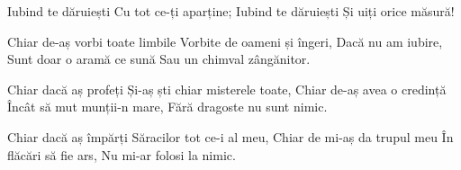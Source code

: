 \beginchorus
Iubind te dăruiești
Cu tot ce-ți aparține;
Iubind te dăruiești
Și uiți orice măsură!
\endchorus

\beginverse
Chiar de-aș vorbi toate limbile
Vorbite de oameni și îngeri,
Dacă nu am iubire,
Sunt doar o aramă ce sună
Sau un chimval zângănitor.
\endverse

\beginverse
Chiar dacă aș profeți
Și-aș ști chiar misterele toate,
Chiar de-aș avea o credință
Încât să mut munții-n mare,
Fără dragoste nu sunt nimic.
\endverse

\beginverse
Chiar dacă aș împărți
Săracilor tot ce-i al meu,
Chiar de mi-aș da trupul meu
În flăcări să fie ars,
Nu mi-ar folosi la nimic.
\endverse
\endsong